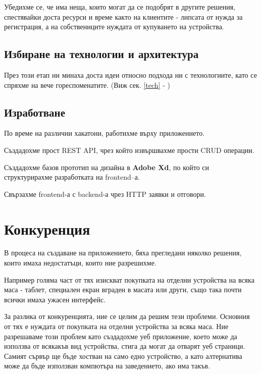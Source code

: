 \documentclass[a4paper]{article}
\begin{document}
\begin{Large}
Убедихме се, че има неща, които могат да се подобрят в другите решения, спестявайки доста ресурси и време както на клиентите - липсата от нужда за регистрация, а на собствениците нуждата от купуването на устройства.

\subsection{Избиране на технологии и архитектура}

През този етап ни минаха доста идеи относно подхода ни с технологиите, като се спряхме на вече гореспоменатите. (Виж сек. \ref{tech} - )

\subsection{Изработване}

По време на различни хакатони, работихме върху приложението.

Създадохме прост REST API, чрез който извършвахме прости CRUD операции.

Създадохме базов прототип на дизайна в \textbf{Adobe Xd}, по който си структурирахме разработката на frontend–а.

Свързахме frontend-а с backend-а чрез HTTP заявки и отговори.

\newpage

\section{Конкуренция}

В процеса на създаване на приложението, бяха прегледани няколко решения, които имаха недостатъци, които ние разрешихме. 

Например голяма част от тях изискват покупката на отделни устройства на всяка маса - таблет, специален екран вграден в масата или други, също така почти всички имаха ужасен интерфейс. 

За разлика от конкуренцията, ние се целим да решим тези проблеми. Основния от тях е нуждата от покупката на отделни устройства за всяка маса. Ние разрешаваме този проблем като създадохме уеб приложение, което може да използва от всякакъв вид устройства, стига да могат да отварят уеб страници. Самият сървър ще бъде хостван на само едно устройство, а като алтернатива може да бъде използван компютъра на заведението, ако има такъв.



\newpage 


\end{Large}
\end{document}
